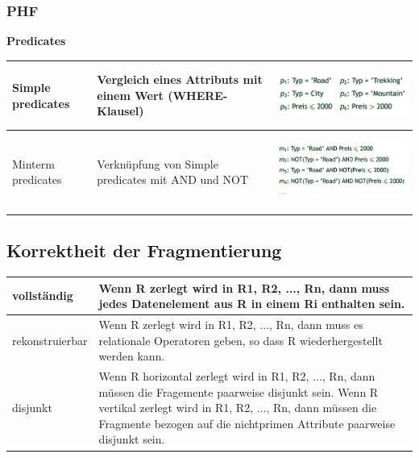 \documentclass[a4paper,11pt]{article}
\begin{document}
\subsubsection{PHF}
\textbf{Predicates}\\
\begin{tabular}{| m{5cm} | m{5cm} | m{6cm} |}
\hline 
Simple predicates & Vergleich eines Attributs mit einem Wert (WHERE-Klausel) & \begin{center}\includegraphics[scale=0.5]{src/simple_predicates.png}\end{center}\\ \hline
Minterm predicates & Verknüpfung von Simple predicates mit AND und NOT & \begin{center}\includegraphics[scale=0.5]{src/minterm_predicates.png}\end{center}\\ \hline
\end{tabular}
\subsection{Korrektheit der Fragmentierung}
\begin{tabular}{| p{5cm} | p{10cm} |}
\hline
vollständig &
Wenn R zerlegt wird in R1, R2, ..., Rn, dann muss jedes Datenelement aus R in einem Ri enthalten sein.\\ \hline
rekonstruierbar &
Wenn R zerlegt wird in R1, R2, ..., Rn, dann muss es relationale Operatoren geben, so dass R wiederhergestellt werden kann.\\ \hline
disjunkt &
Wenn R horizontal zerlegt wird in R1, R2, ..., Rn, dann müssen die Fragemente paarweise disjunkt sein.\newline
Wenn R vertikal zerlegt wird in R1, R2, ..., Rn, dann müssen die Fragmente bezogen auf die nichtprimen Attribute paarweise disjunkt sein.\\ \hline
\end{tabular}
\end{document}
